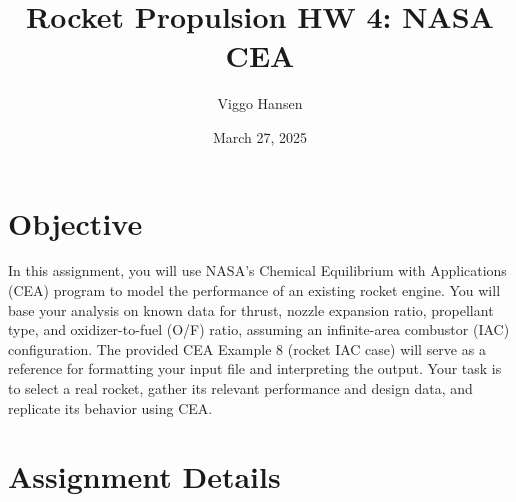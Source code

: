 \documentclass[12pt]{article}
\title{Rocket Propulsion HW 4: NASA CEA}
\author{Viggo Hansen}
\date{March 27, 2025}
\begin{document}
\maketitle

\tableofcontents
\newpage

\section{Objective}
In this assignment, you will use NASA's Chemical Equilibrium with Applications (CEA) program to model the performance of an existing rocket engine. You will base your analysis on known data for thrust, nozzle expansion ratio, propellant type, and oxidizer-to-fuel (O/F) ratio, assuming an infinite-area combustor (IAC) configuration. The provided CEA Example 8 (rocket IAC case) will serve as a reference for formatting your input file and interpreting the output. Your task is to select a real rocket, gather its relevant performance and design data, and replicate its behavior using CEA.

\section{Assignment Details}
\end{document}
